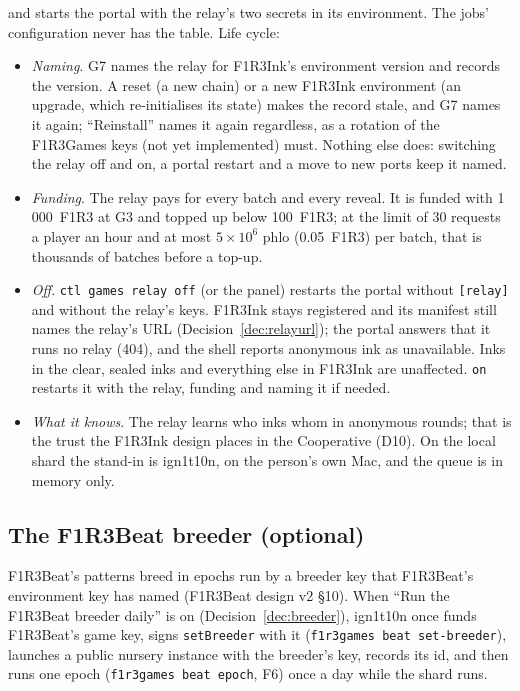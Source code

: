 \documentclass[11pt]{article}
\theoremstyle{definition}
\theoremstyle{remark}
\newcommand{\code}[1]{\texttt{#1}}
\newcommand{\Hr}{ign1t10n}
\newcommand{\Gm}{F1R3Games}
\begin{document}
\noindent
and starts the portal with the relay's two secrets in its environment. The jobs'
configuration never has the table. Life cycle:

\begin{itemize}[nosep]
\item \emph{Naming}. G7 names the relay for F1R3Ink's environment version and
  records the version. A reset (a new chain) or a new F1R3Ink environment (an
  upgrade, which re-initialises its state) makes the record stale, and G7 names it
  again; ``Reinstall'' names it again regardless, as a rotation of the \Gm{} keys
  (not yet implemented) must. Nothing else does: switching the relay off and on, a
  portal restart and a move to new ports keep it named.
\item \emph{Funding}. The relay pays for every batch and every reveal. It is funded
  with 1\,000~F1R3 at G3 and topped up below 100~F1R3; at the limit of 30 requests a
  player an hour and at most $5\times10^6$ phlo (0.05~F1R3) per batch, that is
  thousands of batches before a top-up.
\item \emph{Off}. \code{ctl games relay off} (or the panel) restarts the portal
  without \code{[relay]} and without the relay's keys. F1R3Ink stays registered and
  its manifest still names the relay's URL (Decision~\ref{dec:relayurl}); the portal
  answers that it runs no relay (404), and the shell reports anonymous ink as
  unavailable. Inks in the clear, sealed inks and everything else in F1R3Ink are
  unaffected. \code{on} restarts it with the relay, funding and naming it if needed.
\item \emph{What it knows}. The relay learns who inks whom in anonymous rounds; that
  is the trust the F1R3Ink design places in the Cooperative (D10). On the local
  shard the stand-in is \Hr{}, on the person's own Mac, and the queue is in memory
  only.
\end{itemize}

\subsection{The F1R3Beat breeder (optional)}\label{sec:breeder}

F1R3Beat's patterns breed in epochs run by a breeder key that F1R3Beat's environment
key has named (F1R3Beat design v2 \S10). When ``Run the F1R3Beat breeder daily'' is
on (Decision~\ref{dec:breeder}), \Hr{} once funds F1R3Beat's game key, signs
\code{setBreeder} with it (\code{f1r3games beat set-breeder}), launches a public
nursery instance with the breeder's key, records its id, and then runs one epoch
(\code{f1r3games beat epoch}, F6) once a day while the shard runs.
\end{document}
